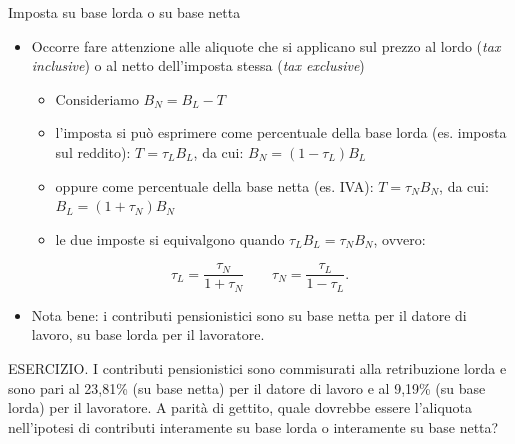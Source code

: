 \documentclass[aspectratio=64,12pt]{beamer}
\begin{document}
\begin{frame}{Imposta su base lorda o su base netta}
\begin{resize}{.95}  
\begin{itemize}
\item Occorre fare attenzione alle aliquote che si applicano sul prezzo al lordo
(\emph{tax inclusive}) o al netto dell'imposta stessa (\emph{tax exclusive})
\begin{itemize}
\item Consideriamo $B_N=B_L-T$
\item l'imposta si può esprimere come percentuale della base lorda (es. imposta sul reddito): $T=\tau_LB_L$, da cui: $B_N=(1-\tau_L)B_L$
\item oppure come percentuale della base netta (es. IVA): $T=\tau_NB_N$, da cui: $B_L=(1+\tau_N)B_N$
\item le due imposte si equivalgono quando $\tau_LB_L=\tau_NB_N$, ovvero:
\end{itemize}
\end{itemize}
\begin{equation*}
\tau_L =\frac{\tau_N}{1+\tau_N} \qquad\tau_N =\frac{\tau_L}{1-\tau_L}.
\end{equation*}
\begin{itemize}
\item Nota bene: i contributi pensionistici sono su base netta per il datore
  di lavoro, su base lorda per il lavoratore.
\end{itemize}
\begin{block}{}
\footnotesize
\alert{ESERCIZIO}. I contributi pensionistici sono commisurati alla retribuzione lorda e sono pari al 23,81\% (su base netta) per il datore di lavoro e al 9,19\% (su base lorda) per il lavoratore. A parità di gettito, quale dovrebbe essere l'aliquota nell'ipotesi di contributi interamente su base lorda o interamente su base netta?
\end{block}
\end{resize}
\end{frame}
\end{document}
